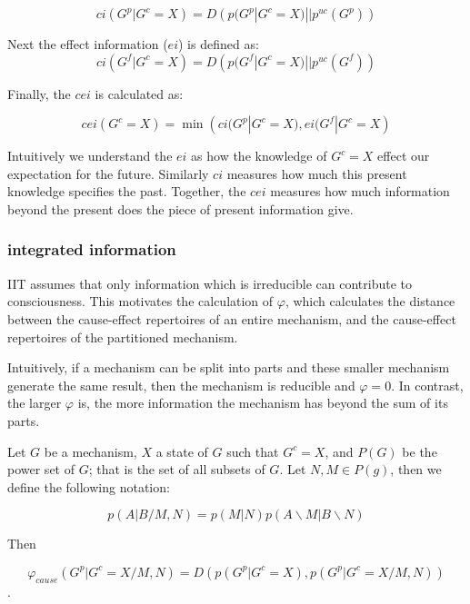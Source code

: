 \begin{equation}
\label{def:ci}
ci(G^p|G^c = X) = D\left(p(G^p|G^c = X)||p^{uc}(G^p)\right)
\end{equation}


Next the effect information ($ei$) is defined as:
\begin{equation}
\label{def:ei}
ci(G^f|G^c = X) = D\left(p(G^f|G^c = X)||p^{uc}(G^f)\right)
\end{equation}

Finally, the $cei$ is calculated as:

\begin{equation}
\label{def:cei}
cei(G^c = X) = \min\left(ci(G^p|G^c = X), ei(G^f|G^c = X \right)
\end{equation}

Intuitively we understand the $ei$ as how the knowledge of $G^c = X$ effect our expectation for the future. Similarly $ci$ measures how much this present knowledge specifies the past. Together, the $cei$ measures how much information beyond the present does the piece of present information give.

\subsubsection{integrated information}
IIT assumes that only information which is irreducible can contribute to consciousness. This motivates the calculation of $\varphi$, which calculates the distance between the cause-effect repertoires of an entire mechanism, and the cause-effect repertoires of the partitioned mechanism. 

Intuitively, if a mechanism can be split into parts and these smaller mechanism generate the same result, then the mechanism is reducible and $\varphi=0$. In contrast, the larger $\varphi$ is, the more information the mechanism has beyond the sum of its parts.

Let $G$ be a mechanism, $X$ a state of $G$ such that $G^c = X$, and $P(G)$ be the power set of $G$; that is the set of all subsets of $G$. Let $N, M \in P(g)$, then we define the following notation:

\begin{equation}
\label{def:preMIP}
p(A|B /M, N)= p(M|N) p(A \backslash M |B \backslash N)
\end{equation}

Then

\begin{equation}
\label{def:phi2}
\varphi_{cause}(G^p|G^c=X/ M, N) = D \left( p(G^p|G^c=X) ,p(G^p|G^c=X/M,N)  \right)
\end{equation}.

